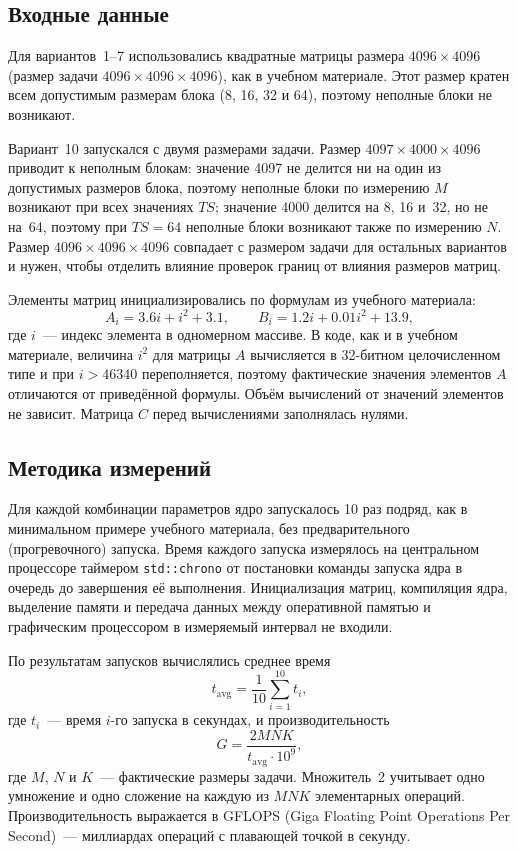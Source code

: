 \documentclass[a4paper]{article}
\begin{document}
\subsection{Входные данные}

Для вариантов~1--7 использовались квадратные матрицы размера
$4096 \times 4096$ (размер задачи $4096 \times 4096 \times 4096$), как
в учебном материале. Этот размер кратен всем допустимым размерам
блока (8, 16, 32 и 64), поэтому неполные блоки не возникают.

Вариант~10 запускался с двумя размерами задачи. Размер
$4097 \times 4000 \times 4096$ приводит к неполным блокам: значение
4097 не делится ни на один из допустимых размеров блока, поэтому
неполные блоки по измерению $M$ возникают при всех значениях $TS$;
значение 4000 делится на 8, 16 и~32, но не на~64, поэтому при $TS=64$
неполные блоки возникают также по измерению $N$. Размер
$4096 \times 4096 \times 4096$ совпадает с размером задачи для
остальных вариантов и нужен, чтобы отделить влияние проверок границ от
влияния размеров матриц.

Элементы матриц инициализировались по формулам из учебного материала:
$$
A_i = 3.6i + i^2 + 3.1,
\qquad
B_i = 1.2i + 0.01i^2 + 13.9,
$$
где $i$~--- индекс элемента в одномерном массиве. В коде, как и в
учебном материале, величина $i^2$ для матрицы $A$ вычисляется в
32-битном целочисленном типе и при $i > 46340$ переполняется, поэтому
фактические значения элементов $A$ отличаются от приведённой формулы.
Объём вычислений от значений элементов не зависит. Матрица $C$ перед
вычислениями заполнялась нулями.

\subsection{Методика измерений}

Для каждой комбинации параметров ядро запускалось 10 раз подряд, как
в минимальном примере учебного материала, без предварительного
(прогревочного) запуска. Время каждого запуска измерялось на
центральном процессоре таймером \texttt{std::chrono} от постановки
команды запуска ядра в очередь до завершения её выполнения.
Инициализация матриц, компиляция ядра, выделение памяти и передача
данных между оперативной памятью и графическим процессором в измеряемый
интервал не входили.

По результатам запусков вычислялись среднее время
$$
t_{\mathrm{avg}} = \frac{1}{10}\sum_{i=1}^{10} t_i,
$$
где $t_i$~--- время $i$-го запуска в секундах, и производительность
$$
G = \frac{2MNK}{t_{\mathrm{avg}}\cdot 10^9},
$$
где $M$, $N$ и $K$~--- фактические размеры задачи. Множитель~2
учитывает одно умножение и одно сложение на каждую из $MNK$
элементарных операций. Производительность выражается в GFLOPS
(Giga Floating Point Operations Per Second)~--- миллиардах операций с
плавающей точкой в секунду.
\end{document}
